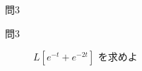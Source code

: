 \begin{frame}{問3}
  \begin{description}
    \item[問3] $L[e^{-t} + e^{-2t}]$ を求めよ
  \end{description}
\end{frame}

